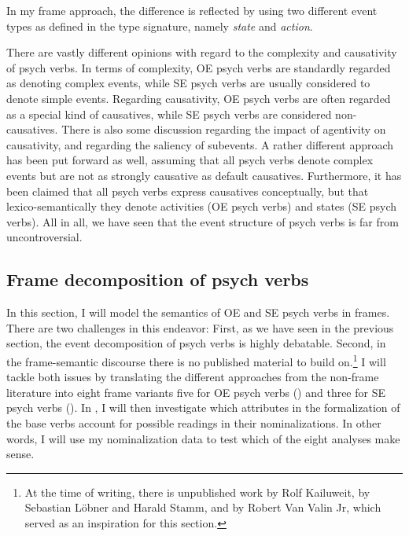 \noindent In my frame approach, the difference is reflected by using two different event types as defined in the type signature, namely \textit{state} and \textit{action}.

There are vastly different opinions with regard to the complexity and causativity of psych verbs. 
In terms of complexity, OE psych verbs are standardly regarded as denoting complex events, while SE psych verbs are usually considered to denote simple events.
Regarding causativity, OE psych verbs are often regarded as a special kind of causatives, while SE psych verbs are considered non-causatives. There is also some discussion regarding the impact of agentivity on causativity, and regarding the saliency of subevents. 
A rather different approach has been put forward as well, assuming that all psych verbs denote complex events but are not as strongly causative as default causatives. 
Furthermore, it has been claimed that all psych verbs express causatives conceptually, but that lexico-semantically they denote activities (OE psych verbs) and states (SE psych verbs). All in all, we have seen that the event structure of psych verbs is far from uncontroversial.

\subsection{Frame decomposition of psych verbs}
\label{sec:psy-input-frames}

In this section, I will model the semantics of OE and SE psych verbs in frames. 
There are two challenges in this endeavor: First, as we have seen in the previous section, the event decomposition of psych verbs is highly debatable.
Second, in the frame-semantic discourse there is no published material to build on.\footnote{At the time of writing, there is unpublished work by Rolf Kailuweit, by Sebastian L\"obner and Harald Stamm, and by Robert Van Valin Jr, which served as an inspiration for this section.} 
I will tackle both issues by translating the different approaches from the non-frame literature into eight frame variants \textendash{} five for OE psych verbs () and three for SE psych verbs (). In , I will then investigate which attributes in the formalization of the base verbs account for possible readings in their nominalizations. In other words, I will use my nominalization data to test which of the eight analyses make sense.


